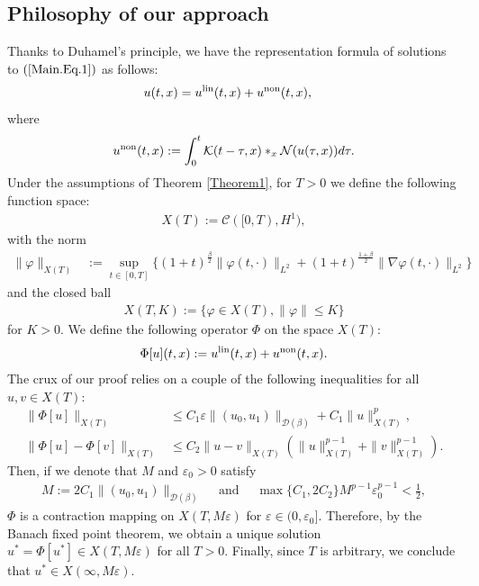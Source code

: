 \documentclass[11pt,reqno]{amsart}
\begin{document}
\subsection{Philosophy of our approach}
Thanks to Duhamel's principle, we have the representation formula of solutions to $(\ref{Main.Eq.1})$ as follows:
\begin{align*}
    u(t,x)
    &= u^{\rm lin}(t,x) + u^{\rm non}(t,x),
\end{align*}
where
\begin{align*}
    u^{\rm non}(t,x) := \int_0^t \mathcal{K}(t-\tau,x) \ast_x \mathcal{N}(u(\tau,x)) d\tau.
\end{align*}
Under the assumptions of Theorem \ref{Theorem1}, for $T>0$ we define the following function space:
\begin{align*}
    X(T) :=  \mathcal{C}([0, T), H^1),
\end{align*}
with the norm
\begin{align*}
    \|\varphi\|_{X(T)} &:= \sup _{t \in [0,T]} \bigg\{(1+t)^{\frac{\beta}{2}}\|\varphi(t,\cdot)\|_{L^2} + (1+t)^{\frac{1+\beta}{2}} \| \nabla\varphi(t,\cdot)\|_{L^2} \bigg\}
\end{align*}
and the closed ball
     \begin{align*}
         X(T, K) := \{ \varphi \in X(T), \|\varphi\| \leq K\}
     \end{align*}
     for $K > 0$.
We define the following operator $\Phi$ on the space $X(T)$:
\begin{align*}
   \Phi[u](t,x) := u^{\rm lin}(t,x) + u^{\rm non}(t,x).
\end{align*}
The crux of our proof relies on a couple of the following inequalities for all $u, v \in X(T)$:
    \begin{align}
        \|\Phi[u]\|_{X(T)} &\leq C_1 \varepsilon \|(u_0, u_1)\|_{\mathcal{D}(\beta)} + C_1\|u\|_{X(T)}^p,  \label{Es.Pro2.1}\\
        \|\Phi[u]-\Phi[v]\|_{X(T)} &\leq C_2 \|u-v\|_{X(T)}\left(\|u\|_{X(T)}^{p-1}+\|v\|_{X(T)}^{p-1}\right) \label{Es.Pro2.2}.
    \end{align}
 Then, if we denote that $M$ and $\varepsilon_0 > 0$ satisfy
     \begin{align*}
         M:=  2C_1\|(u_0, u_1)\|_{\mathcal{D}(\beta)} \quad\text{ and }\quad \max\{C_1, 2C_2\} M^{p-1} \varepsilon_0^{p-1} < \frac{1}{2},
     \end{align*}
      $\Phi$ is a contraction mapping on $X(T, M\varepsilon)$ for $\varepsilon \in (0, \varepsilon_0]$. Therefore, by the Banach fixed point theorem, we obtain a unique solution $u^* = \Phi[u^*] \in X(T, M\varepsilon)$ for all $T > 0$. Finally, since $T$ is arbitrary, we conclude that $u^* \in X(\infty, M\varepsilon)$.
\end{document}
